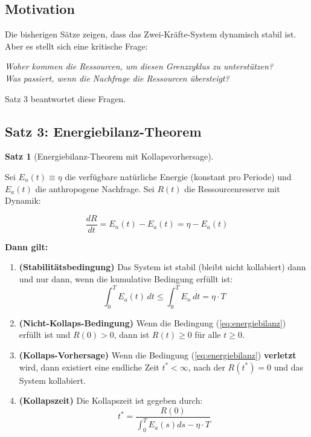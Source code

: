 \documentclass[a4paper, 12pt, twoside, openright]{report}
\theoremstyle{definition}
\theoremstyle{definition}
\newtheorem{satz}{Satz}[chapter]
\begin{document}
\subsection{Motivation}

Die bisherigen Sätze zeigen, dass das Zwei-Kräfte-System dynamisch stabil ist. Aber es stellt sich eine kritische Frage:

\begin{center}
    \textit{Woher kommen die Ressourcen, um diesen Grenzzyklus zu unterstützen?}\\
    \textit{Was passiert, wenn die Nachfrage die Ressourcen übersteigt?}
\end{center}

Satz 3 beantwortet diese Fragen.

\subsection{Satz 3: Energiebilanz-Theorem}

\begin{satz}[Energiebilanz-Theorem mit Kollapsvorhersage]\label{satz:energiebilanz}
    
    Sei $E_n(t) \equiv \eta$ die verfügbare natürliche Energie (konstant pro Periode) und $E_a(t)$ die anthropogene Nachfrage. Sei $R(t)$ die Ressourcenreserve mit Dynamik:
    
    \begin{equation}
        \frac{dR}{dt} = E_n(t) - E_a(t) = \eta - E_a(t)
    \end{equation}
    
    \textbf{Dann gilt:}
    
    \begin{enumerate}
        \item \textbf{(Stabilitätsbedingung)} Das System ist stabil (bleibt nicht kollabiert) dann und nur dann, wenn die kumulative Bedingung erfüllt ist:
        \begin{equation}
            \boxed{\int_0^T E_a(t) \, dt \leq \int_0^T E_n \, dt = \eta \cdot T}
            \label{eq:energiebilanz}
        \end{equation}
        
        \item \textbf{(Nicht-Kollaps-Bedingung)} Wenn die Bedingung (\ref{eq:energiebilanz}) erfüllt ist und $R(0) > 0$, dann ist $R(t) \geq 0$ für alle $t \geq 0$.
        
        \item \textbf{(Kollaps-Vorhersage)} Wenn die Bedingung (\ref{eq:energiebilanz}) \textbf{verletzt} wird, dann existiert eine endliche Zeit $t^* < \infty$, nach der $R(t^*) = 0$ und das System kollabiert.
        
        \item \textbf{(Kollapszeit)} Die Kollapszeit ist gegeben durch:
        \begin{equation}
            \boxed{t^* = \frac{R(0)}{\int_0^T E_a(s) ds - \eta \cdot T}}
            \label{eq:kollapszeit}
        \end{equation}
    \end{enumerate}
\end{satz}
\end{document}
